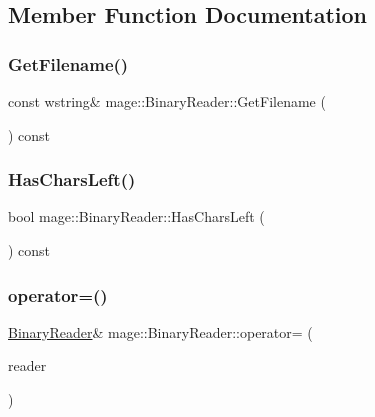 \subsection{Member Function Documentation}
\hypertarget{classmage_1_1_binary_reader_a10a0ec56fe7f8e63964ffca2afe019a3}{}\label{classmage_1_1_binary_reader_a10a0ec56fe7f8e63964ffca2afe019a3} 
\subsubsection{\texorpdfstring{Get\+Filename()}{GetFilename()}}
{\footnotesize\ttfamily const wstring\& mage\+::\+Binary\+Reader\+::\+Get\+Filename (\begin{DoxyParamCaption}{ }\end{DoxyParamCaption}) const}

\hypertarget{classmage_1_1_binary_reader_a35b10713dca7a416b73b28d5f6aaf600}{}\label{classmage_1_1_binary_reader_a35b10713dca7a416b73b28d5f6aaf600} 
\subsubsection{\texorpdfstring{Has\+Chars\+Left()}{HasCharsLeft()}}
{\footnotesize\ttfamily bool mage\+::\+Binary\+Reader\+::\+Has\+Chars\+Left (\begin{DoxyParamCaption}{ }\end{DoxyParamCaption}) const\hspace{0.3cm}{\ttfamily [protected]}}

\hypertarget{classmage_1_1_binary_reader_a0408bb456983b4a03ae42ab69c6f4bc3}{}\label{classmage_1_1_binary_reader_a0408bb456983b4a03ae42ab69c6f4bc3} 
\subsubsection{\texorpdfstring{operator=()}{operator=()}\hspace{0.1cm}{\footnotesize\ttfamily [1/2]}}
{\footnotesize\ttfamily \hyperlink{classmage_1_1_binary_reader}{Binary\+Reader}\& mage\+::\+Binary\+Reader\+::operator= (\begin{DoxyParamCaption}\item[{const \hyperlink{classmage_1_1_binary_reader}{Binary\+Reader} \&}]{reader }\end{DoxyParamCaption})\hspace{0.3cm}{\ttfamily [delete]}}

